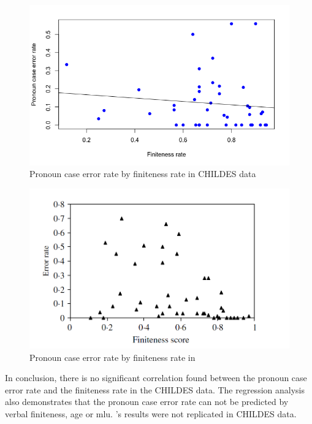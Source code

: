 \FloatBarrier
\begin{figure}[!h]
    \centering
    \includegraphics[scale = 0.5]{graph/Rispo1.png}
    \vspace{-1.5em}
    \caption{Pronoun case error rate by finiteness rate in CHILDES data }
    \label{fig:780}
\end{figure}
\FloatBarrier

\FloatBarrier
\begin{figure}[!h]
    \centering
    \includegraphics[scale = 0.4]{graph/Rispo2.png}
    \vspace{-1em}
    \caption{Pronoun case error rate by finiteness rate in \cite{rispoli2005}}
    \label{fig:781}
\end{figure}
\FloatBarrier

In conclusion, there is no significant correlation found between the pronoun case error rate and the finiteness rate in the CHILDES data. The regression analysis also demonstrates that the pronoun case error rate can not be predicted by verbal finiteness, age or mlu. \cite{rispoli2005}'s results were not replicated in CHILDES data.



